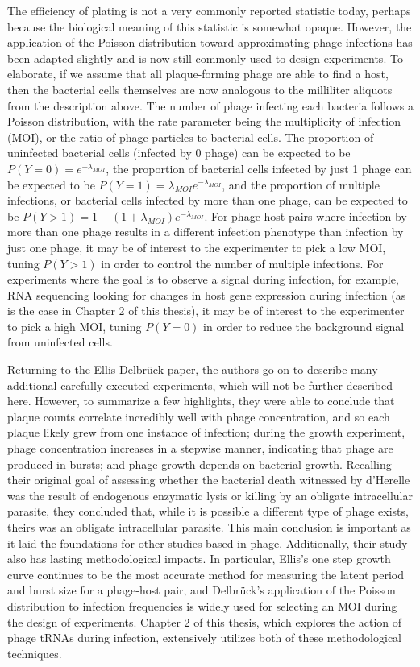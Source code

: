 \documentclass[12pt,twoside]{mitthesis-manusdown}
\begin{document}
The efficiency of plating is not a very commonly reported statistic
today, perhaps because the biological meaning of this statistic is
somewhat opaque. However, the application of the Poisson distribution
toward approximating phage infections has been adapted slightly and is
now still commonly used to design experiments. To elaborate, if we
assume that all plaque-forming phage are able to find a host, then the
bacterial cells themselves are now analogous to the milliliter aliquots
from the description above. The number of phage infecting each bacteria
follows a Poisson distribution, with the rate parameter being the
multiplicity of infection (MOI), or the ratio of phage particles to
bacterial cells. The proportion of uninfected bacterial cells (infected
by 0 phage) can be expected to be \(P(Y = 0) = e^{-\lambda_{MOI}}\), the
proportion of bacterial cells infected by just 1 phage can be expected
to be \(P(Y = 1) = \lambda_{MOI} e^{-\lambda_{MOI}}\), and the
proportion of multiple infections, or bacterial cells infected by more
than one phage, can be expected to be
\(P(Y > 1) = 1-(1+\lambda_{MOI})e^{-\lambda_{MOI}}\). For phage-host
pairs where infection by more than one phage results in a different
infection phenotype than infection by just one phage, it may be of
interest to the experimenter to pick a low MOI, tuning \(P(Y > 1)\) in
order to control the number of multiple infections. For experiments
where the goal is to observe a signal during infection, for example, RNA
sequencing looking for changes in host gene expression during infection
(as is the case in Chapter 2 of this thesis), it may be of interest to
the experimenter to pick a high MOI, tuning \(P(Y=0)\) in order to
reduce the background signal from uninfected cells.

Returning to the Ellis-Delbrück paper, the authors go on to describe
many additional carefully executed experiments, which will not be
further described here. However, to summarize a few highlights, they
were able to conclude that plaque counts correlate incredibly well with
phage concentration, and so each plaque likely grew from one instance of
infection; during the growth experiment, phage concentration increases
in a stepwise manner, indicating that phage are produced in bursts; and
phage growth depends on bacterial growth. Recalling their original goal
of assessing whether the bacterial death witnessed by d'Herelle was the
result of endogenous enzymatic lysis or killing by an obligate
intracellular parasite, they concluded that, while it is possible a
different type of phage exists, theirs was an obligate intracellular
parasite. This main conclusion is important as it laid the foundations
for other studies based in phage. Additionally, their study also has
lasting methodological impacts. In particular, Ellis's one step growth
curve continues to be the most accurate method for measuring the latent
period and burst size for a phage-host pair, and Delbrück's application
of the Poisson distribution to infection frequencies is widely used for
selecting an MOI during the design of experiments. Chapter 2 of this
thesis, which explores the action of phage tRNAs during infection,
extensively utilizes both of these methodological techniques.
\end{document}
